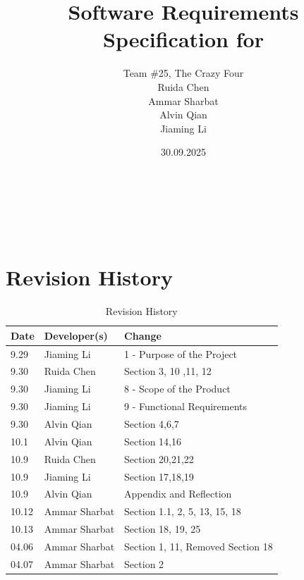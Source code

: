 \documentclass[12pt]{article}
\begin{document}
\title{Software Requirements Specification for\\\progname}
\author{
    Team \#25, The Crazy Four \\[1ex]
    Ruida Chen \\
    Ammar Sharbat \\
    Alvin Qian \\
    Jiaming Li
}
\date{30.09.2025}
    
\maketitle

~\newpage


\tableofcontents

~\newpage

\section*{Revision History}

\begin{table}[hp]
    \caption{Revision History} \label{TblRevisionHistory}
    \begin{tabularx}{\textwidth}{llX}
        \toprule
        \textbf{Date} & \textbf{Developer(s)} & \textbf{Change}\\
        \midrule
        9.29 & Jiaming Li & 1 - Purpose of the Project\\
        9.30 & Ruida Chen & Section 3, 10 ,11,  12\\
        9.30 & Jiaming Li & 8 - Scope of the Product\\
        9.30 & Jiaming Li & 9 - Functional Requirements\\
        9.30 & Alvin Qian & Section 4,6,7\\
        10.1 & Alvin Qian & Section 14,16\\
        10.9 & Ruida Chen & Section 20,21,22\\
        10.9 & Jiaming Li & Section 17,18,19\\
        10.9 & Alvin Qian & Appendix and Reflection\\
        10.12 & Ammar Sharbat & Section 1.1, 2, 5, 13, 15, 18\\
        10.13 & Ammar Sharbat & Section 18, 19, 25\\
        04.06 & Ammar Sharbat & Section 1, 11, Removed Section 18\\
        04.07 & Ammar Sharbat & Section 2\\
        
        \bottomrule
    \end{tabularx}
\end{table}
\end{document}

